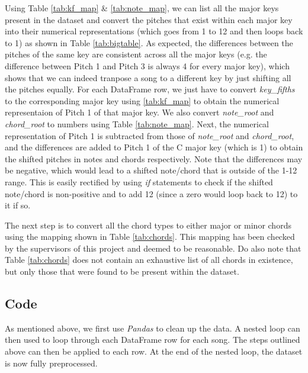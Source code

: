 Using Table \ref{tab:kf_map} \& \ref{tab:note_map}, we can list all the major keys present in the dataset and convert the pitches that exist within each major key into their numerical representations (which goes from 1 to 12 and then loops back to 1) as shown in Table \ref{tab:bigtable}. As expected, the differences between the pitches of the same key are consistent across all the major keys (e.g. the difference between Pitch 1 and Pitch 3 is always 4 for every major key), which shows that we can indeed tranpose a song to a different key by just shifting all the pitches equally. For each DataFrame row, we just have to convert \emph{key\_fifths} to the corresponding major key using \ref{tab:kf_map} to obtain the numerical representaion of Pitch 1 of that major key. We also convert \emph{note\_root} and \emph{chord\_root} to numbers using Table \ref{tab:note_map}. Next, the numerical representation of Pitch 1 is subtracted from those of \emph{note\_root} and \emph{chord\_root}, and the differences are added to Pitch 1 of the C major key (which is 1) to obtain the shifted pitches in notes and chords respectively. Note that the differences may be negative, which would lead to a shifted note/chord that is outside of the 1-12 range. This is easily rectified by using \emph{if} statements to check if the shifted note/chord is non-positive and to add 12 (since a zero would loop back to 12) to it if so.

The next step is to convert all the chord types to either major or minor chords using the mapping shown in Table \ref{tab:chords}. This mapping has been checked by the supervisors of this project and deemed to be reasonable. Do also note that Table \ref{tab:chords} does not contain an exhaustive list of all chords in existence, but only those that were found to be present within the dataset.

\subsection{Code}
As mentioned above, we first use \emph{Pandas} to clean up the data. A nested loop can then used to loop through each DataFrame row for each song. The steps outlined above can then be applied to each row. At the end of the nested loop, the dataset is now fully preprocessed.


